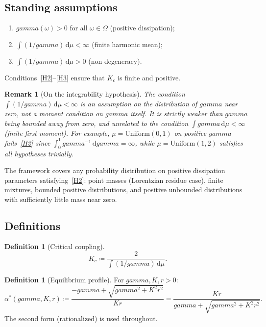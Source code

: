 \documentclass[11pt,a4paper]{article}
\let\gamma\relax\def\gamma{gamma}%
\newtheorem{remark}[theorem]{Remark}
\theoremstyle{definition}
\newtheorem{definition}[theorem]{Definition}
\begin{document}
\subsection{Standing assumptions}

\begin{enumerate}[label=(H\arabic*),nosep]
\item\label{H1} $\gamma(\omega) > 0$ for all $\omega \in \Omega$ (positive dissipation);
\item\label{H2} $\int (1/\gamma)\,\mathrm{d}\mu < \infty$ (finite harmonic mean);
\item\label{H3} $\int (1/\gamma)\,\mathrm{d}\mu > 0$ (non-degeneracy).
\end{enumerate}
Conditions~\ref{H2}--\ref{H3} ensure that $K_c$ is finite and positive.

\begin{remark}[On the integrability hypothesis]
The condition $\int(1/\gamma)\,\mathrm{d}\mu < \infty$ is an assumption on the distribution of $\gamma$ near zero, \emph{not} a moment condition on $\gamma$ itself. It is strictly weaker than $\gamma$ being bounded away from zero, and unrelated to the condition $\int\gamma\,\mathrm{d}\mu < \infty$ (finite first moment). For example, $\mu = \text{Uniform}(0,1)$ on positive $\gamma$ fails~\ref{H2} since $\int_0^1 \gamma^{-1}\,\mathrm{d}\gamma = \infty$, while $\mu = \text{Uniform}(1,2)$ satisfies all hypotheses trivially.
\end{remark}

The framework covers any probability distribution on positive dissipation parameters satisfying~\ref{H2}: point masses (Lorentzian residue case), finite mixtures, bounded positive distributions, and positive unbounded distributions with sufficiently little mass near zero.

\subsection{Definitions}

\begin{definition}[Critical coupling]\label{def:Kc}
\begin{equation}\label{eq:Kc}
K_c \coloneqq \frac{2}{\int (1/\gamma)\,\mathrm{d}\mu}.
\end{equation}
\end{definition}

\begin{definition}[Equilibrium profile]\label{def:alpha}
For $\gamma, K, r > 0$:
\begin{equation}\label{eq:alpha-star}
\alpha^*(\gamma, K, r) \coloneqq \frac{-\gamma + \sqrt{\gamma^2 + K^2 r^2}}{Kr} = \frac{Kr}{\gamma + \sqrt{\gamma^2 + K^2 r^2}}.
\end{equation}
The second form (rationalized) is used throughout.
\end{definition}
\end{document}
